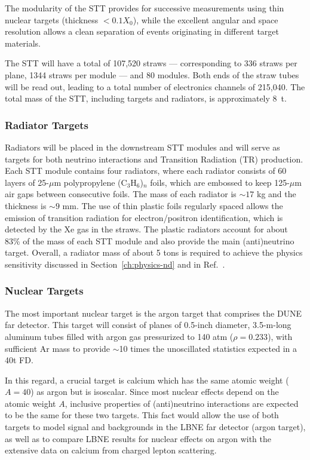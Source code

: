 The modularity of the STT provides for successive measurements using
thin nuclear targets (thickness $< 0.1 X_0$), while the excellent
angular and space resolution allows a clean separation of events
originating in different target materials.

The STT will have a total of 107,520 straws  --- corresponding to 336 straws per plane,
1344 straws per module ---
and 80 modules. Both ends of the straw tubes will be read out, leading to a total
number of electronics channels of 215,040. The total mass of the STT, including targets and radiators, is approximately 8~t.  

\subsubsection{Radiator Targets} 


Radiators will be placed in the downstream STT modules
and will serve as targets for both neutrino interactions 
and Transition Radiation (TR) production. Each STT module contains 
four radiators, where each radiator consists of
60 layers of 25-$\mu$m polypropylene (C$_3$H$_6$)$_n$ 
foils, which are embossed to keep 125-$\mu$m air gaps between 
consecutive foils. 
The mass of each radiator is $\sim17$ kg and the thickness is 
$\sim9$ mm. The use of thin plastic foils regularly spaced allows 
the emission of transition radiation for electron/positron identification, 
which is detected by the Xe gas in the straws. 
% 
The plastic radiators account for about 83\% of the mass of each STT module and 
also provide the main (anti)neutrino target. Overall, a radiator mass of about 5 tons 
is required to achieve the physics sensitivity discussed in Section~\ref{ch:physics-nd} 
and in Ref.~\cite{DPR}. 

\subsubsection{Nuclear Targets} 

The most important nuclear target is the argon target that comprises the DUNE far detector.
This target will consist of planes of 0.5-inch diameter, 3.5-m-long aluminum tubes filled
with argon gas pressurized to 140 atm ($\rho = 0.233$), with sufficient Ar mass to provide 
$\sim$10 times the unoscillated statistics expected in a 40t FD. 

In this regard, a crucial target is calcium which has the same atomic weight ($A=40$) 
as argon but is isoscalar. 
Since most nuclear effects depend on the atomic weight
$A$, inclusive properties of (anti)neutrino interactions are expected
to be the same for these two targets.
This fact would allow the use of both targets to model signal and
backgrounds in the LBNE far detector (argon target), as well as to
compare LBNE results for nuclear effects on argon with the extensive
data on calcium from charged lepton scattering. 


